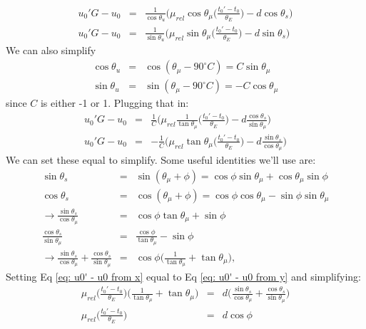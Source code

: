 \documentclass[twocolumn]{aastex701}
\begin{document}
\begin{eqnarray}
    u_{0}'G - u_0 &=& \frac{1}{\cos\theta_{u}}\Big(\mu_{rel}\cos\theta_{\mu}\Big(\frac{t_0' - t_0}{\theta_E}\Big) - d\cos\theta_s\Big) \\
    u_{0}'G - u_0&=&\frac{1}{\sin\theta_{u}}\Big(\mu_{rel}\sin\theta_{\mu}\Big(\frac{t_0' - t_0}{\theta_E}\Big) - d\sin\theta_s\Big)
\end{eqnarray}
We can also simplify 
\begin{eqnarray}
    \cos\theta_u &=& \cos(\theta_\mu - 90^{\circ}C) = C\sin\theta_{\mu} \\
    \sin\theta_u &=& \sin(\theta_\mu - 90^{\circ}C) = -C\cos\theta_{\mu}
\end{eqnarray}
since $C$ is either -1 or 1. Plugging that in:
\begin{eqnarray}
\label{eq: u0' - u0 from x}
    u_{0}'G - u_0 &=& \frac{1}{C}\Big(\mu_{rel}\frac{1}{\tan\theta_{\mu}}\Big(\frac{t_0' - t_0}{\theta_E}\Big) - d\frac{\cos\theta_s}{\sin\theta_{\mu}}\Big) \\
    \label{eq: u0' - u0 from y}
    u_{0}'G - u_0&=&-\frac{1}{C}\Big(\mu_{rel}\tan\theta_{\mu}\Big(\frac{t_0' - t_0}{\theta_E}\Big) - d\frac{\sin\theta_s}{\cos\theta_{\mu}}\Big)
\end{eqnarray}
We can set these equal to simplify. Some useful identities we'll use are:
\begin{eqnarray}
\label{eq: sin(theta_s) convention}
    \sin\theta_s &=& \sin(\theta_{\mu} + \phi) = \cos\phi\sin\theta_{\mu} + \cos\theta_{\mu}\sin\phi \\
\label{eq: cos(theta_s) convention}
    \cos\theta_s &=& \cos(\theta_{\mu} + \phi) = \cos\phi\cos\theta_{\mu} - \sin\phi\sin\theta_{\mu} \\
    \rightarrow \frac{\sin\theta_s}{\cos\theta_{\mu}} &=& \cos\phi\tan\theta_{\mu} + \sin\phi \\
    \frac{\cos\theta_s}{\sin\theta_{\mu}} &=& \frac{\cos\phi}{\tan\theta_{\mu}} - \sin\phi \\
    \rightarrow \frac{\sin\theta_s}{\cos\theta_{\mu}} + \frac{\cos\theta_s}{\sin\theta_{\mu}} &=& \cos\phi\Big(\frac{1}{\tan\theta_{\mu}} + \tan\theta_{\mu}\Big),
\end{eqnarray}
Setting Eq \ref{eq: u0' - u0 from x} equal to Eq \ref{eq: u0' - u0 from y} and simplifying:
\begin{eqnarray}
    \mu_{rel}\Big(\frac{t_0' - t_0}{\theta_E}\Big)\Big(\frac{1}{\tan\theta_{\mu}} + \tan\theta_{\mu}\Big) &=& d\Big( \frac{\sin\theta_s}{\cos\theta_{\mu}} + \frac{\cos\theta_s}{\sin\theta_{\mu}}\Big) \\
    \label{eq: mu_rel, ts, phi relation}
    \mu_{rel}\Big(\frac{t_0' - t_0}{\theta_E}\Big) &=& d \cos\phi
\end{eqnarray}
\end{document}

